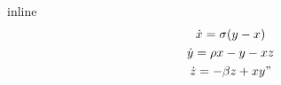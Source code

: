 inline
\begin{gather}
\dot{x} = \sigma(y-x) \\
\dot{y} = \rho x - y - xz \\
\dot{z} = -\beta z + xy"
\end{gather}